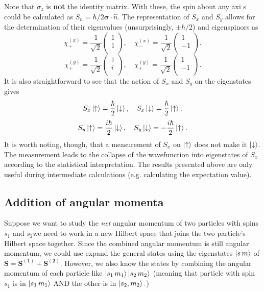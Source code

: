 \documentclass{article}
\newcommand{\up}{\ket{\uparrow}} %
\newcommand{\dn}{\ket{\downarrow}} %
\theoremstyle{nonumberplain}
\begin{document}
Note that $\sigma_z$ is \textbf{not} the identity matrix. With these, the spin about any axi s could be calculated as  $S_n = \hbar /2 \mathbf{\sigma} \cdot \hat{n}. $ The representation of $S_x$ and $S_y$ allows for the determination of their eigenvalues (unsurprisingly, $\pm \hbar /2$) and eigenspinors as 
\[
    \chi_+^{(x)} = \frac{1}{\sqrt{2} }\begin{pmatrix}
         1 \\
         1 \\
    \end{pmatrix}, \quad 
    \chi_-^{(x)} = \frac{1}{\sqrt{2} }\begin{pmatrix}
         1 \\
         -1 \\
    \end{pmatrix}.
\] 
\[
    \chi_+^{(y)} = \frac{1}{\sqrt{2} } \begin{pmatrix}
         1 \\
         i \\
    \end{pmatrix}, \quad 
    \chi_+^{(y)} = \frac{1}{\sqrt{2} } \begin{pmatrix}
         1 \\
         -1 \\
    \end{pmatrix}. 
\]
It is also straightforward to see that the action of $S_x$ and $S_y$ on the eigenstates gives 
\[
    S_x \up = \frac{\hbar}{2} \dn, \quad S_x \dn = \frac{\hbar}{2} \up;
\]
\[
    S_y \up = \frac{i \hbar}{2} \dn, \quad S_y \dn = -\frac{i \hbar}{2} \up. 
\]
It is worth noting, though, that a measurement of $S_x$ on $\up$ does not make it $\dn$. The measurement leads to the collapse of the wavefunction into eigenstates of $S_x$ according to the statistical interpretation. The results presented above are only useful during intermediate calculations (e.g. calculating the expectation value). 
\subsection{Addition of angular momenta} 
Suppose we want to study the \textit{net} angular momentum of two particles with spins $s_1$ and $s_2$\textemdash we need to work in a new Hilbert space that joins the two particle's Hilbert space together. Since the combined angular momentum is still angular momentum, we could use expand the general states using the eigenstates $\ket{s \, m}$ of $\mathbf{S} = \mathbf{S^{(1)}} + \mathbf{S^{(2)}} $. However, we also know the states by combining the angular momentum of each particle like $\ket{s_1 \, m_1} \ket{s_2 \, m_2}$ (meaning that particle with spin $s_1$ is in $\ket{s_1 \, m_1}$ AND the other is in $\ket{s_2, m_2}.$) 
\end{document}
